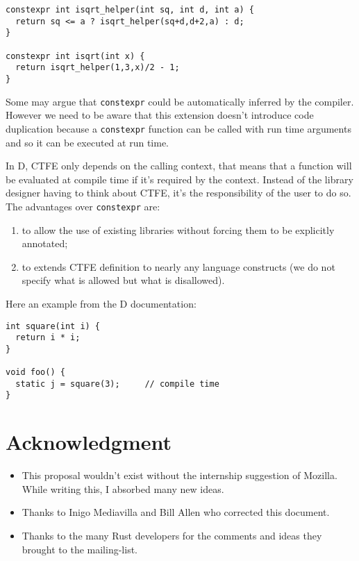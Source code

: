 \documentclass[a4paper,11pt]{article}
\begin{document}
\begin{lstlisting}
constexpr int isqrt_helper(int sq, int d, int a) {
  return sq <= a ? isqrt_helper(sq+d,d+2,a) : d;
}

constexpr int isqrt(int x) {
  return isqrt_helper(1,3,x)/2 - 1;
}
\end{lstlisting}

Some may argue that \lstinline{constexpr} could be automatically inferred by the compiler. However we need to be aware that this extension doesn't introduce code duplication because a \lstinline{constexpr} function can be called with run time arguments and so it can be executed at run time.
\newline

In D, CTFE only depends on the calling context, that means that a function will be evaluated at compile time if it's required by the context. Instead of the library designer having to think about CTFE, it's the responsibility of the user to do so. The advantages over \lstinline{constexpr} are:

\begin{enumerate}
\item to allow the use of existing libraries without forcing them to be explicitly annotated;
\item to extends CTFE definition to nearly any language constructs (we do not specify what is allowed but what is disallowed).
\end{enumerate}

Here an example from the D documentation\cite{D_CTFE}:

\begin{lstlisting}
int square(int i) {
  return i * i;
}

void foo() {
  static j = square(3);     // compile time
}
\end{lstlisting}

\section{Acknowledgment}

\begin{itemize}
\item This proposal wouldn't exist without the internship suggestion of Mozilla.  While writing this, I absorbed many new ideas.
\item Thanks to Inigo Mediavilla and Bill Allen who corrected this document.
\item Thanks to the many Rust developers for the comments and ideas they brought to the mailing-list.
\end{itemize}
\end{document}
